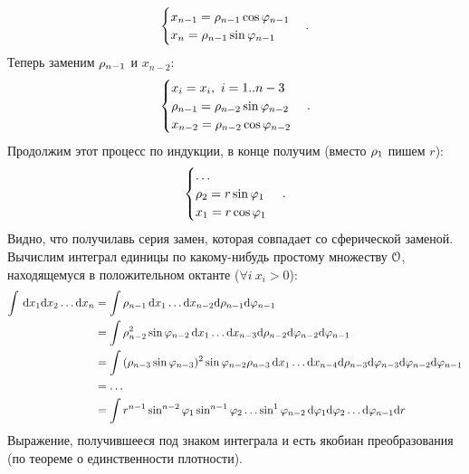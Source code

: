 {\begin{example}
\begin{itemize}
\[\begin{cases}
                    x_{n - 1} = \rho_{n - 1} \cos{\varphi_{n - 1}} \\
                    x_n = \rho_{n - 1} \sin{\varphi_{n - 1}}
                \end{cases}
            .\]
            Теперь заменим $\rho_{n - 1}$ и $x_{n - 2}$:
            \[
                \begin{cases}
                    x_i = x_i,~ i = 1..{n-3} \\
                    \rho_{n - 1} = \rho_{n - 2} \sin{\varphi_{n - 2}} \\
                    x_{n - 2} = \rho_{n - 2} \cos{\varphi_{n - 2}}
                \end{cases}
            .\]
            Продолжим этот процесс по индукции, в конце получим (вместо $\rho_1$ пишем $r$):
            \[
                \begin{cases}
                    \ldots \\
                    \rho_2 = r \sin{\varphi_1} \\
                    x_1 = r \cos{\varphi_1}
                \end{cases}
            .\]
            Видно, что получилавь серия замен, которая совпадает со сферической заменой.
            Вычислим интеграл единицы по какому-нибудь простому множеству $\mathcal{O}$, находящемуся в
            положительном октанте ($\forall i~ x_i > 0$):
            \begin{align*}
                \int\limits{\,\mathrm{d}x_1 \mathrm{d}x_2 \ldots \mathrm{d}x_n} 
                &= \int\limits{\rho_{n - 1} \,\mathrm{d}x_1 \ldots \mathrm{d}x_{n - 2} \mathrm{d}\rho_{n - 1} \mathrm{d}\varphi_{n - 1}} \\
                &= \int\limits{\rho^2_{n - 2} \sin{\varphi_{n - 2}} \,\mathrm{d}x_1 \ldots \mathrm{d}x_{n - 3} \mathrm{d}\rho_{n - 2} 
                    \mathrm{d}\varphi_{n - 2} \mathrm{d}\varphi_{n - 1}} \\
                &= \int\limits{(\rho_{n - 3} \sin{\varphi_{n - 3}})^2 \sin{\varphi_{n - 2}} \rho_{n - 3} 
                    \,\mathrm{d}x_1 \ldots \mathrm{d}x_{n - 4} \mathrm{d}\rho_{n - 3} \mathrm{d}\varphi_{n - 3} \mathrm{d}\varphi_{n - 2} \mathrm{d}\varphi_{n - 1}} \\
                &= \ldots \\
                &= \int\limits{r^{n - 1} \sin^{n - 2}{\varphi_1} \sin^{n - 1}{\varphi_2} \ldots \sin^1{\varphi_{n - 2}}
                    \,\mathrm{d}\varphi_1 \mathrm{d}\varphi_2 \ldots \mathrm{d}\varphi_{n - 1} \mathrm{d}r} 
            \end{align*}
            Выражение, получившееся под знаком интеграла и есть якобиан преобразования (по теореме о
            единственности плотности).
    \end{itemize}
\end{example}

}
